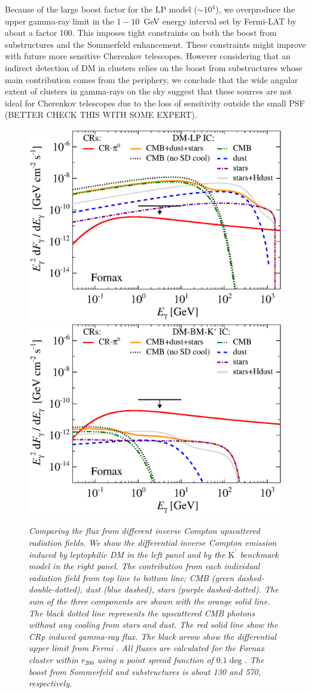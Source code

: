 \documentclass[10pt,aps,pra,reprint,amsmath,amsfonts,amssymb,showpacs]{revtex4-1}
\newcommand{\rmn}{\mathrm}
\newcommand{\Kp}{\rmn{K}^\prime}
\newcommand{\rvir}{r_{200}}
\begin{document}
Because of the large boost factor for the LP model ($\sim 10^4$), we
overproduce the upper gamma-ray limit in the $1-10$~GeV energy
interval set by Fermi-LAT by about a factor 100. This imposes tight
constraints on both the boost from substructures and the Sommerfeld
enhancement. These constraints might improve with future more
sensitive Cherenkov telescopes. However considering that an indirect
detection of DM in clusters relies on the boost from substructures
whose main contribution comes from the periphery, we conclude that the
wide angular extent of clusters in gamma-rays on the sky suggest that
these sources are not ideal for Cherenkov telescopes due to the loss
of sensitivity outside the small PSF (BETTER CHECK THIS WITH SOME
EXPERT).

\begin{figure}
\begin{minipage}{2.0\columnwidth}
\includegraphics[width=0.49\columnwidth]{figures/flux.IRcomp.v10.0.1deg.1.6T.SubMass.elmu.SF300.noMW.woGal.eps}
\includegraphics[width=0.49\columnwidth]{figures/flux.IRcomp.BMv10.0.1deg.SubMass.noMW.woGal.eps}
\caption{\it Comparing the flux from different inverse Compton
  upscattered radiation fields. We show the differential inverse
  Compton emission induced by leptophilic DM in the left panel and by
  the $\Kp$ benchmark model in the right panel. The contribution from
  each individual radiation field from top line to bottom line; CMB
  (green dashed-double-dotted), dust (blue dashed), stars (purple
  dashed-dotted). The sum of the three components are shown with the
  orange solid line. The black dotted line represents the upscattered
  CMB photons without any cooling from stars and dust. The red solid
  line show the CRp induced gamma-ray flux. The black arrow show the
  differential upper limit from Fermi \cite{2010ApJ...717L..71A}. All
  fluxes are calculated for the Fornax cluster within $\rvir$ using a
  point spread function of $0.1\deg$. The boost from Sommerfeld and
  substructures is about 130 and 570, respectively.}
 \label{fig:IR_comp}
\end{minipage}
\end{figure}
\end{document}
